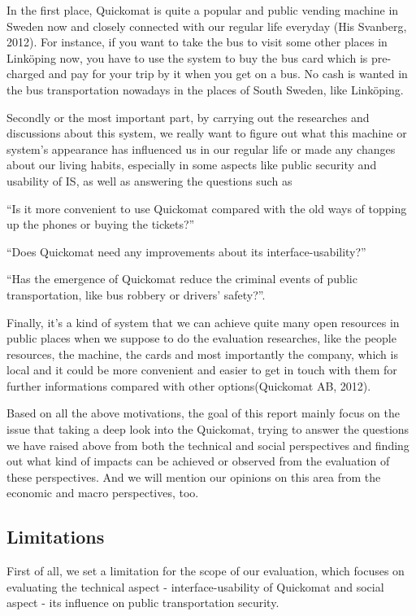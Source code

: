\documentclass[twocolumn]{article}
\begin{document}
In the first place, Quickomat is quite a popular and public vending machine in Sweden now and closely connected with our regular life everyday (His Svanberg, 2012). For instance, if you want to take the bus to visit some other places in Linköping now, you have to use the system to buy the bus card which is pre-charged and pay for your trip by it when you get on a bus. No cash is wanted in the bus transportation nowadays in the places of South Sweden, like Linköping.

Secondly or the most important part, by carrying out the researches and discussions about this system, we really want to figure out what this machine or system’s appearance has influenced us in our regular life or made any changes about our living habits, especially in some aspects like public security and usability of IS, as well as answering the questions such as
\begin{enumeration}
  \item “Is it more convenient to use Quickomat compared with the old ways of topping up the phones or buying the tickets?”
  \item “Does Quickomat need any improvements  about its interface-usability?”
  \item “Has the emergence of Quickomat reduce the criminal events of public transportation, like bus robbery or drivers’ safety?”.
\end{enumeration}

Finally, it’s a kind of system that we can achieve quite many open resources in public places when we suppose to do the evaluation researches, like the people resources, the machine, the cards and most importantly the company, which is local and it could be more convenient and easier to get in touch with them for further informations compared with other options(Quickomat AB, 2012). 

Based on all the above motivations, the goal of this report mainly focus on the issue that taking a deep look into the Quickomat, trying to answer the questions we have raised above from both the technical and social perspectives and finding out what kind of impacts can be achieved or observed from the evaluation of these perspectives. And we will mention our opinions on this area from the economic and macro perspectives, too.

\subsection{Limitations}
First of all, we set a limitation for the scope of our evaluation, which focuses on evaluating the technical aspect - interface-usability of Quickomat and social aspect - its influence on public transportation security. 
\end{document}
